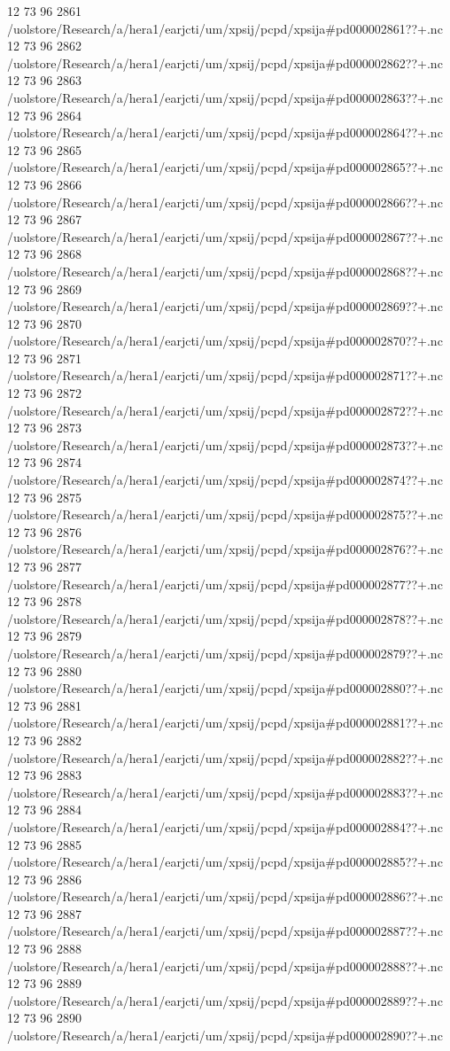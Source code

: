 12 73 96
2861
/uolstore/Research/a/hera1/earjcti/um/xpsij/pcpd/xpsija#pd000002861??+.nc
12 73 96
2862
/uolstore/Research/a/hera1/earjcti/um/xpsij/pcpd/xpsija#pd000002862??+.nc
12 73 96
2863
/uolstore/Research/a/hera1/earjcti/um/xpsij/pcpd/xpsija#pd000002863??+.nc
12 73 96
2864
/uolstore/Research/a/hera1/earjcti/um/xpsij/pcpd/xpsija#pd000002864??+.nc
12 73 96
2865
/uolstore/Research/a/hera1/earjcti/um/xpsij/pcpd/xpsija#pd000002865??+.nc
12 73 96
2866
/uolstore/Research/a/hera1/earjcti/um/xpsij/pcpd/xpsija#pd000002866??+.nc
12 73 96
2867
/uolstore/Research/a/hera1/earjcti/um/xpsij/pcpd/xpsija#pd000002867??+.nc
12 73 96
2868
/uolstore/Research/a/hera1/earjcti/um/xpsij/pcpd/xpsija#pd000002868??+.nc
12 73 96
2869
/uolstore/Research/a/hera1/earjcti/um/xpsij/pcpd/xpsija#pd000002869??+.nc
12 73 96
2870
/uolstore/Research/a/hera1/earjcti/um/xpsij/pcpd/xpsija#pd000002870??+.nc
12 73 96
2871
/uolstore/Research/a/hera1/earjcti/um/xpsij/pcpd/xpsija#pd000002871??+.nc
12 73 96
2872
/uolstore/Research/a/hera1/earjcti/um/xpsij/pcpd/xpsija#pd000002872??+.nc
12 73 96
2873
/uolstore/Research/a/hera1/earjcti/um/xpsij/pcpd/xpsija#pd000002873??+.nc
12 73 96
2874
/uolstore/Research/a/hera1/earjcti/um/xpsij/pcpd/xpsija#pd000002874??+.nc
12 73 96
2875
/uolstore/Research/a/hera1/earjcti/um/xpsij/pcpd/xpsija#pd000002875??+.nc
12 73 96
2876
/uolstore/Research/a/hera1/earjcti/um/xpsij/pcpd/xpsija#pd000002876??+.nc
12 73 96
2877
/uolstore/Research/a/hera1/earjcti/um/xpsij/pcpd/xpsija#pd000002877??+.nc
12 73 96
2878
/uolstore/Research/a/hera1/earjcti/um/xpsij/pcpd/xpsija#pd000002878??+.nc
12 73 96
2879
/uolstore/Research/a/hera1/earjcti/um/xpsij/pcpd/xpsija#pd000002879??+.nc
12 73 96
2880
/uolstore/Research/a/hera1/earjcti/um/xpsij/pcpd/xpsija#pd000002880??+.nc
12 73 96
2881
/uolstore/Research/a/hera1/earjcti/um/xpsij/pcpd/xpsija#pd000002881??+.nc
12 73 96
2882
/uolstore/Research/a/hera1/earjcti/um/xpsij/pcpd/xpsija#pd000002882??+.nc
12 73 96
2883
/uolstore/Research/a/hera1/earjcti/um/xpsij/pcpd/xpsija#pd000002883??+.nc
12 73 96
2884
/uolstore/Research/a/hera1/earjcti/um/xpsij/pcpd/xpsija#pd000002884??+.nc
12 73 96
2885
/uolstore/Research/a/hera1/earjcti/um/xpsij/pcpd/xpsija#pd000002885??+.nc
12 73 96
2886
/uolstore/Research/a/hera1/earjcti/um/xpsij/pcpd/xpsija#pd000002886??+.nc
12 73 96
2887
/uolstore/Research/a/hera1/earjcti/um/xpsij/pcpd/xpsija#pd000002887??+.nc
12 73 96
2888
/uolstore/Research/a/hera1/earjcti/um/xpsij/pcpd/xpsija#pd000002888??+.nc
12 73 96
2889
/uolstore/Research/a/hera1/earjcti/um/xpsij/pcpd/xpsija#pd000002889??+.nc
12 73 96
2890
/uolstore/Research/a/hera1/earjcti/um/xpsij/pcpd/xpsija#pd000002890??+.nc
